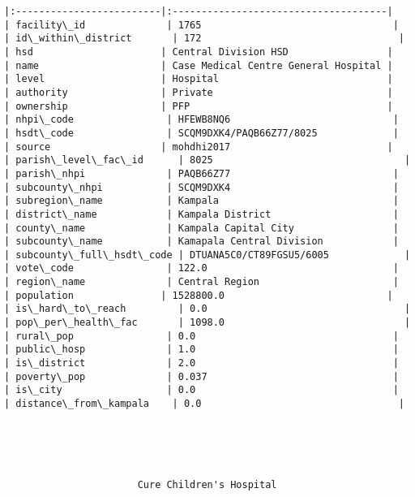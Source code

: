 \documentclass[11pt]{article}
\begin{document}
\begin{Verbatim}[commandchars=\\\{\}]
|:-------------------------|:-------------------------------------|
| facility\_id              | 1765                                 |
| id\_within\_district       | 172                                  |
| hsd                      | Central Division HSD                 |
| name                     | Case Medical Centre General Hospital |
| level                    | Hospital                             |
| authority                | Private                              |
| ownership                | PFP                                  |
| nhpi\_code                | HFEWB8NQ6                            |
| hsdt\_code                | SCQM9DXK4/PAQB66Z77/8025             |
| source                   | mohdhi2017                           |
| parish\_level\_fac\_id      | 8025                                 |
| parish\_nhpi              | PAQB66Z77                            |
| subcounty\_nhpi           | SCQM9DXK4                            |
| subregion\_name           | Kampala                              |
| district\_name            | Kampala District                     |
| county\_name              | Kampala Capital City                 |
| subcounty\_name           | Kamapala Central Division            |
| subcounty\_full\_hsdt\_code | DTUANA5C0/CT89FGSU5/6005             |
| vote\_code                | 122.0                                |
| region\_name              | Central Region                       |
| population               | 1528800.0                            |
| is\_hard\_to\_reach         | 0.0                                  |
| pop\_per\_health\_fac       | 1098.0                               |
| rural\_pop                | 0.0                                  |
| public\_hosp              | 1.0                                  |
| is\_district              | 2.0                                  |
| poverty\_pop              | 0.037                                |
| is\_city                  | 0.0                                  |
| distance\_from\_kampala    | 0.0                                  |





                       Cure Children's Hospital                       


\end{Verbatim}
\end{document}
